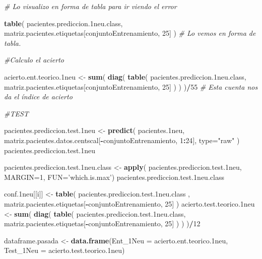 \documentclass[]{article}
\newenvironment{Shaded}{\begin{snugshade}}{\end{snugshade}}
\newcommand{\CommentTok}[1]{\textcolor[rgb]{0.56,0.35,0.01}{\textit{#1}}}
\newcommand{\DataTypeTok}[1]{\textcolor[rgb]{0.13,0.29,0.53}{#1}}
\newcommand{\DecValTok}[1]{\textcolor[rgb]{0.00,0.00,0.81}{#1}}
\newcommand{\FloatTok}[1]{\textcolor[rgb]{0.00,0.00,0.81}{#1}}
\newcommand{\KeywordTok}[1]{\textcolor[rgb]{0.13,0.29,0.53}{\textbf{#1}}}
\newcommand{\NormalTok}[1]{#1}
\newcommand{\OperatorTok}[1]{\textcolor[rgb]{0.81,0.36,0.00}{\textbf{#1}}}
\newcommand{\StringTok}[1]{\textcolor[rgb]{0.31,0.60,0.02}{#1}}
\begin{document}
\begin{Shaded}
\begin{Highlighting}[]
  \CommentTok{# Lo visualizo en forma de tabla para ir viendo el error}
  
  \KeywordTok{table}\NormalTok{( pacientes.prediccion}\FloatTok{.1}\NormalTok{neu.class, matriz.pacientes.etiquetas[conjuntoEntrenamiento, }\DecValTok{25}\NormalTok{] )  }\CommentTok{# Lo vemos en forma de tabla.}
  
  \CommentTok{#Calculo el acierto}
  
\NormalTok{  acierto.ent.teorico}\FloatTok{.1}\NormalTok{neu <-}\StringTok{ }\KeywordTok{sum}\NormalTok{( }\KeywordTok{diag}\NormalTok{( }\KeywordTok{table}\NormalTok{( pacientes.prediccion}\FloatTok{.1}\NormalTok{neu.class, matriz.pacientes.etiquetas[conjuntoEntrenamiento, }\DecValTok{25}\NormalTok{] ) ) )}\OperatorTok{/}\DecValTok{55} \CommentTok{# Esta cuenta nos da el índice de acierto}
  
  \CommentTok{#TEST}
  
\NormalTok{  pacientes.prediccion.test}\FloatTok{.1}\NormalTok{neu <-}\StringTok{ }\KeywordTok{predict}\NormalTok{( pacientes}\FloatTok{.1}\NormalTok{neu, }
\NormalTok{                                             matriz.pacientes.datos.centscal[}\OperatorTok{-}\NormalTok{conjuntoEntrenamiento, }\DecValTok{1}\OperatorTok{:}\DecValTok{24}\NormalTok{], }
                                             \DataTypeTok{type=}\StringTok{"raw"}\NormalTok{ )}
\NormalTok{  pacientes.prediccion.test}\FloatTok{.1}\NormalTok{neu}
  
\NormalTok{  pacientes.prediccion.test}\FloatTok{.1}\NormalTok{neu.class <-}\StringTok{ }\KeywordTok{apply}\NormalTok{( pacientes.prediccion.test}\FloatTok{.1}\NormalTok{neu, }\DataTypeTok{MARGIN=}\DecValTok{1}\NormalTok{, }\DataTypeTok{FUN=}\StringTok{'which.is.max'}\NormalTok{)}
\NormalTok{  pacientes.prediccion.test}\FloatTok{.1}\NormalTok{neu.class}
  
\NormalTok{  conf}\FloatTok{.1}\NormalTok{neu[[i]] <-}\StringTok{ }\KeywordTok{table}\NormalTok{( pacientes.prediccion.test}\FloatTok{.1}\NormalTok{neu.class , matriz.pacientes.etiquetas[}\OperatorTok{-}\NormalTok{conjuntoEntrenamiento, }\DecValTok{25}\NormalTok{] )}
\NormalTok{  acierto.test.teorico}\FloatTok{.1}\NormalTok{neu <-}\StringTok{ }\KeywordTok{sum}\NormalTok{( }\KeywordTok{diag}\NormalTok{( }\KeywordTok{table}\NormalTok{( pacientes.prediccion.test}\FloatTok{.1}\NormalTok{neu.class, matriz.pacientes.etiquetas[}\OperatorTok{-}\NormalTok{conjuntoEntrenamiento, }\DecValTok{25}\NormalTok{] ) ) )}\OperatorTok{/}\DecValTok{12}
  
\NormalTok{  dataframe.pasada <-}\StringTok{ }\KeywordTok{data.frame}\NormalTok{(}\DataTypeTok{Ent_1Neu =}\NormalTok{ acierto.ent.teorico}\FloatTok{.1}\NormalTok{neu,}
                                 \DataTypeTok{Test_1Neu =}\NormalTok{ acierto.test.teorico}\FloatTok{.1}\NormalTok{neu)}
  

\end{Highlighting}
\end{Shaded}
\end{document}

